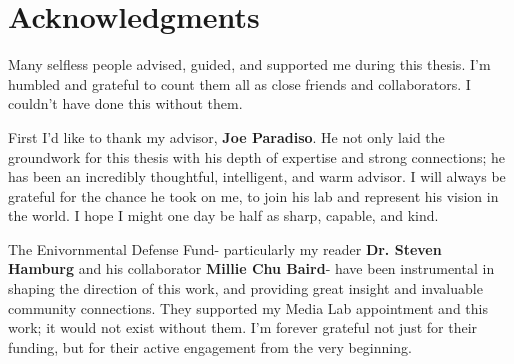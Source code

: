 \begin{abstractpage}
}


\end{abstractpage}
% 

\cleardoublepage


\readerpage

\clearpage


\readerpage

\cleardoublepage
{}

\section*{Acknowledgments}

Many selfless people advised, guided, and supported me during this thesis.  I'm humbled and grateful to count them all as close friends and collaborators.  I couldn't have done this without them.

First I'd like to thank my advisor, \textbf{Joe Paradiso}.  He not only laid the groundwork for this thesis with his depth of expertise and strong connections; he has been an incredibly thoughtful, intelligent, and warm advisor.  I will always be grateful for the chance he took on me, to join his lab and represent his vision in the world.  I hope I might one day be half as sharp, capable, and kind.

The Enivornmental Defense Fund- particularly my reader \textbf{Dr. Steven Hamburg} and his collaborator \textbf{Millie Chu Baird}- have been instrumental in shaping the direction of this work, and providing great insight and invaluable community connections.  They supported my Media Lab appointment and this work; it would not exist without them.  I'm forever grateful not just for their funding, but for their active engagement from the very beginning.


